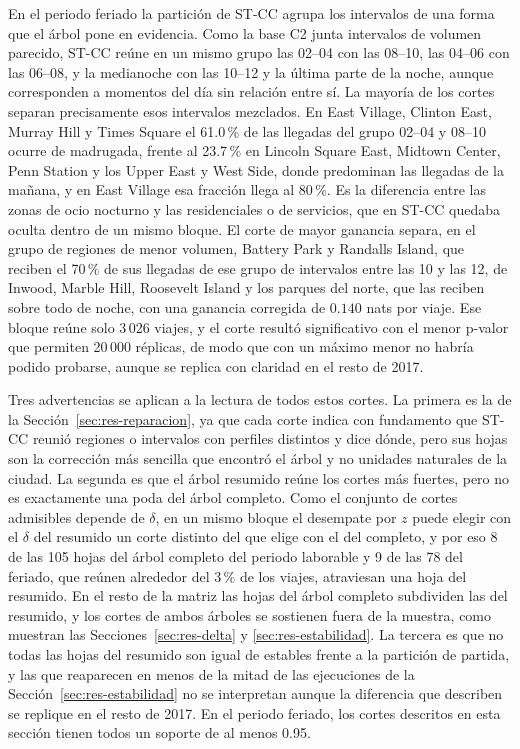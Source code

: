 En el periodo feriado la partición de ST-CC agrupa los intervalos de una forma
que el árbol pone en evidencia. Como la base C2 junta intervalos de volumen
parecido, ST-CC reúne en un mismo grupo las 02--04 con las 08--10, las 04--06 con
las 06--08, y la medianoche con las 10--12 y la última parte de la noche, aunque
corresponden a momentos del día sin relación entre sí. La mayoría de los cortes
separan precisamente esos intervalos mezclados. En East Village, Clinton East,
Murray Hill y Times Square el 61.0\,\% de las llegadas del grupo 02--04 y 08--10
ocurre de madrugada, frente al 23.7\,\% en Lincoln Square East, Midtown Center,
Penn Station y los Upper East y West Side, donde predominan las llegadas de la
mañana, y en East Village esa fracción llega al 80\,\%. Es la diferencia entre
las zonas de ocio nocturno y las residenciales o de servicios, que en ST-CC
quedaba oculta dentro de un mismo bloque. El corte de mayor ganancia separa, en
el grupo de regiones de menor volumen, Battery Park y Randalls Island, que reciben
el 70\,\% de sus llegadas de ese grupo de intervalos entre las 10 y las 12, de
Inwood, Marble Hill, Roosevelt Island y los parques del norte, que las reciben
sobre todo de noche, con una ganancia corregida de $0.140$ nats por viaje. Ese
bloque reúne solo 3\,026 viajes, y el corte resultó significativo con el menor
p-valor que permiten 20\,000 réplicas, de modo que con un máximo menor no habría
podido probarse, aunque se replica con claridad en el resto de 2017.

Tres advertencias se aplican a la lectura de todos estos cortes. La primera es la
de la Sección~\ref{sec:res-reparacion}, ya que cada corte indica con fundamento que
ST-CC reunió regiones o intervalos con perfiles distintos y dice dónde, pero sus hojas
son la corrección más sencilla que encontró el árbol y no unidades naturales de la
ciudad. La segunda es que el árbol resumido reúne los cortes más fuertes, pero no
es exactamente una poda del árbol completo. Como el conjunto de cortes admisibles
depende de $\delta$, en un mismo bloque el desempate por $z$ puede elegir con el
$\delta$ del resumido un corte distinto del que elige con el del completo, y por
eso 8 de las 105 hojas del árbol completo del periodo laborable y 9 de las 78 del
feriado, que reúnen alrededor del 3\,\% de los viajes, atraviesan una hoja del
resumido. En el resto de la matriz las hojas del árbol completo subdividen las del
resumido, y los cortes de ambos árboles se sostienen fuera de la muestra, como
muestran las Secciones~\ref{sec:res-delta} y \ref{sec:res-estabilidad}. La
tercera es que no todas las hojas del resumido son igual de estables frente a la
partición de partida, y las que reaparecen en menos de la mitad de las ejecuciones
de la Sección~\ref{sec:res-estabilidad} no se interpretan aunque la diferencia
que describen se replique en el resto de 2017. En el periodo feriado, los cortes
descritos en esta sección tienen todos un soporte de al menos 0.95.

